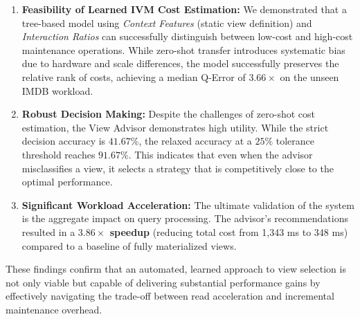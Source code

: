 \begin{enumerate}
    \item \textbf{Feasibility of Learned IVM Cost Estimation:} We demonstrated that a tree-based model using \textit{Context Features} (static view definition) and \textit{Interaction Ratios} can successfully distinguish between low-cost and high-cost maintenance operations. While zero-shot transfer introduces systematic bias due to hardware and scale differences, the model successfully preserves the relative rank of costs, achieving a median Q-Error of $3.66\times$ on the unseen IMDB workload.
    
    \item \textbf{Robust Decision Making:} Despite the challenges of zero-shot cost estimation, the View Advisor demonstrates high utility. While the strict decision accuracy is $41.67\%$, the relaxed accuracy at a $25\%$ tolerance threshold reaches $91.67\%$. This indicates that even when the advisor misclassifies a view, it selects a strategy that is competitively close to the optimal performance.
    
    \item \textbf{Significant Workload Acceleration:} The ultimate validation of the system is the aggregate impact on query processing. The advisor's recommendations resulted in a \textbf{$3.86\times$ speedup} (reducing total cost from 1,343 ms to 348 ms) compared to a baseline of fully materialized views.
\end{enumerate}

These findings confirm that an automated, learned approach to view selection is not only viable but capable of delivering substantial performance gains by effectively navigating the trade-off between read acceleration and incremental maintenance overhead.
